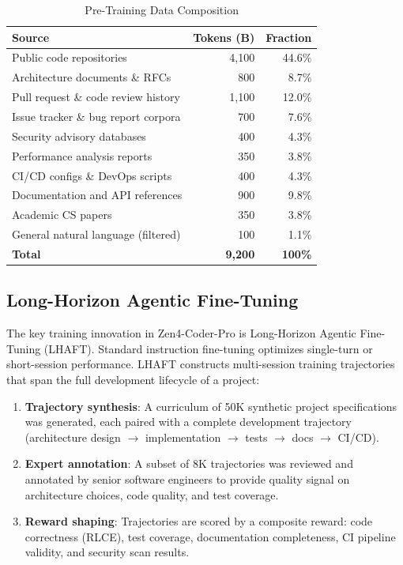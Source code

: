 \documentclass[11pt,a4paper]{article}
\begin{document}
\begin{table}[H]
\centering
\caption{Pre-Training Data Composition}
\begin{tabular}{lrr}
\toprule
\textbf{Source} & \textbf{Tokens (B)} & \textbf{Fraction} \\
\midrule
Public code repositories & 4,100 & 44.6\% \\
Architecture documents \& RFCs & 800 & 8.7\% \\
Pull request \& code review history & 1,100 & 12.0\% \\
Issue tracker \& bug report corpora & 700 & 7.6\% \\
Security advisory databases & 400 & 4.3\% \\
Performance analysis reports & 350 & 3.8\% \\
CI/CD configs \& DevOps scripts & 400 & 4.3\% \\
Documentation and API references & 900 & 9.8\% \\
Academic CS papers & 350 & 3.8\% \\
General natural language (filtered) & 100 & 1.1\% \\
\midrule
\textbf{Total} & \textbf{9,200} & \textbf{100\%} \\
\bottomrule
\end{tabular}
\end{table}

\subsection{Long-Horizon Agentic Fine-Tuning}

The key training innovation in Zen4-Coder-Pro is Long-Horizon Agentic Fine-Tuning (LHAFT). Standard instruction fine-tuning optimizes single-turn or short-session performance. LHAFT constructs multi-session training trajectories that span the full development lifecycle of a project:

\begin{enumerate}
  \item \textbf{Trajectory synthesis}: A curriculum of 50K synthetic project specifications was generated, each paired with a complete development trajectory (architecture design $\to$ implementation $\to$ tests $\to$ docs $\to$ CI/CD).
  \item \textbf{Expert annotation}: A subset of 8K trajectories was reviewed and annotated by senior software engineers to provide quality signal on architecture choices, code quality, and test coverage.
  \item \textbf{Reward shaping}: Trajectories are scored by a composite reward: code correctness (RLCE), test coverage, documentation completeness, CI pipeline validity, and security scan results.
\end{enumerate}
\end{document}
